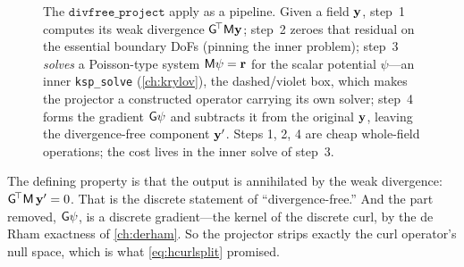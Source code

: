 \begin{figure}[t]
\centering
{}
\caption[The four-step divergence-free projector apply]{The
$\mathtt{divfree\_project}$ apply as a pipeline. Given a field $\mathbf{y}$, step~1
computes its weak divergence $\mathsf{G}^{\!\top}\mathsf{M}\mathbf{y}$; step~2 zeroes that
residual on the essential boundary DoFs (pinning the inner problem); step~3
\emph{solves} a Poisson-type system $\mathsf{M}\psi=\mathbf{r}$ for the scalar potential
$\psi$---an inner \texttt{ksp\_solve} (\cref{ch:krylov}), the dashed/violet box,
which makes the projector a constructed operator carrying its own solver; step~4
forms the gradient $\mathsf{G}\psi$ and subtracts it from the original $\mathbf{y}$,
leaving the divergence-free component $\mathbf{y}'$. Steps 1, 2, 4 are cheap whole-field
operations; the cost lives in the inner solve of step~3.}
\label{fig:projapply}
\end{figure}

The defining property is that the output is annihilated by the weak divergence:
$\mathsf{G}^{\!\top}\mathsf{M}\,\mathbf{y}' = 0$. That is the discrete statement of
``divergence-free.'' And the part removed, $\mathsf{G}\psi$, is a discrete
gradient---the kernel of the discrete curl, by the de Rham exactness of
\cref{ch:derham}. So the projector strips exactly the curl operator's null space,
which is what \cref{eq:hcurlsplit} promised.

